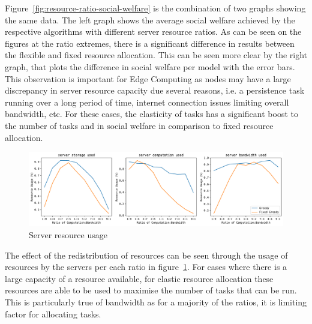 Figure~\ref{fig:resource-ratio-social-welfare} is the combination of two graphs showing the same data. The left graph
shows the average social welfare achieved by the respective algorithms with different server resource ratios. As can be
seen on the figures at the ratio extremes, there is a significant difference in results between the flexible and fixed
resource allocation. This can be seen more clear by the right graph, that plots the difference in social welfare per
model with the error bars. \\
This observation is important for Edge Computing as nodes may have a large discrepancy in server resource capacity
due several reasons, i.e. a persistence task running over a long period of time, internet connection issues limiting
overall bandwidth, etc. For these cases, the elasticity of tasks has a significant boost to the number of tasks and
in social welfare in comparison to fixed resource allocation.

\begin{figure}[h]
    \centering
    \includegraphics[width=\linewidth]{figs/resource_ratio/server_resource_usage.pdf}
    \caption{Server resource usage}
    \label{fig:resource-ratio-server-resource-usage}
\end{figure}

The effect of the redistribution of resources can be seen through the usage of resources by the servers per
each ratio in figure~\ref{fig:resource-ratio-server-resource-usage}. For cases where there is a large capacity of a
resource available, for elastic resource allocation these resources are able to be used to maximise the number of tasks
that can be run. This is particularly true of bandwidth as for a majority of the ratios, it is limiting factor for
allocating tasks.

